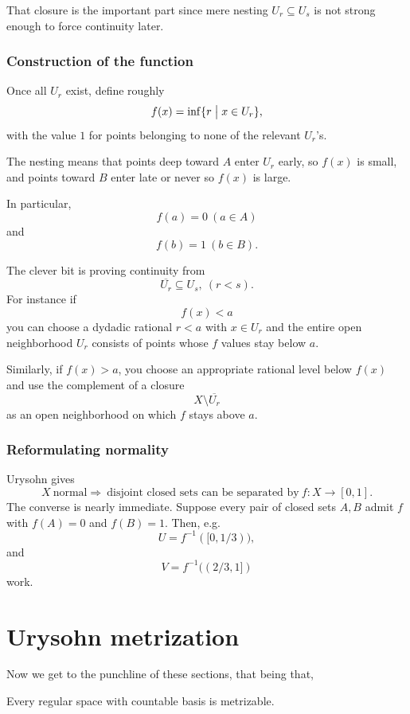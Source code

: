 \documentclass[11pt]{article}
\begin{document}
That closure is the important part since 
mere nesting $U_r \subseteq U_s$ is not strong 
enough to force continuity later. 

\subsubsection{Construction of the function}

Once all $U_r$ exist, define roughly 
\[
    f(x) = \inf\{r \bigm| x \in U_r\},
\]
with the value $1$ for points belonging 
to none of the relevant $U_r$'s. 

The nesting means that 
points deep toward $A$ enter $U_r$ early, so 
$f(x)$ is small, and points toward $B$ enter 
late or never so $f(x)$ is large. 

In particular, 
\[
    f(a) = 0 \ (a \in A)
\]
and 
\[
    f(b) = 1 \ (b \in B). 
\]

The clever bit is proving continuity from 
\[
    \overline{U_r} \subseteq U_s, \ (r < s). 
\]
For instance if 
\[
    f(x) < a 
\]
you can choose a dydadic rational 
$r < a$ with $x \in U_r$ and the entire open 
neighborhood $U_r$ consists of points whose 
$f$ values stay below $a$. 

Similarly, if $f(x) > a$, 
you choose an appropriate rational level 
below $f(x)$ and use the complement of a 
closure 
\[
    X \setminus \overline{U_r}
\]
as an open neighborhood on which $f$ stays 
above $a$. 

\subsubsection{Reformulating normality}

Urysohn gives 
\[
    X \ \text{normal} 
    \Rightarrow \ \text{disjoint 
    closed sets can be separated by} \ f : X \to [0,1]. 
\]
The converse is nearly immediate. 
Suppose every pair of closed sets $A,B$ admit $f$ 
with $f(A) = 0$ and $f(B) = 1$.
Then, e.g. 
\[
    U = f^{-1}([0,1/3)), 
\]
and 
\[
    V = f^{-1}((2/3,1])
\]
work. 

\section{Urysohn metrization}

Now we get to the punchline of these sections, 
that being that, 
\begin{thm}
    Every regular space with countable 
    basis is metrizable. 
\end{thm}
\end{document}
